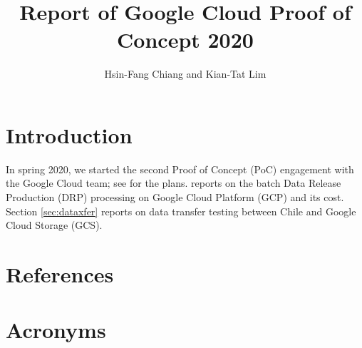 \documentclass[DM,authoryear,toc,lsstdraft]{lsstdoc}
\title{Report of Google Cloud Proof of Concept 2020}
\author{%
Hsin-Fang Chiang and Kian-Tat Lim
}
\date{\vcsDate}
\begin{document}
\mkshorttitle

\section{Introduction}

In spring 2020, we started the second Proof of Concept (PoC) engagement with the Google Cloud team; see  for the plans.
  reports on the batch Data Release Production (DRP) processing on Google Cloud Platform (GCP) and its cost.
Section \ref{sec:dataxfer} reports on data transfer testing between Chile and Google Cloud Storage (GCS).





\appendix
\section{References} \label{sec:bib}
\renewcommand{\refname}{} %


\section{Acronyms} \label{sec:acronyms}

\end{document}
